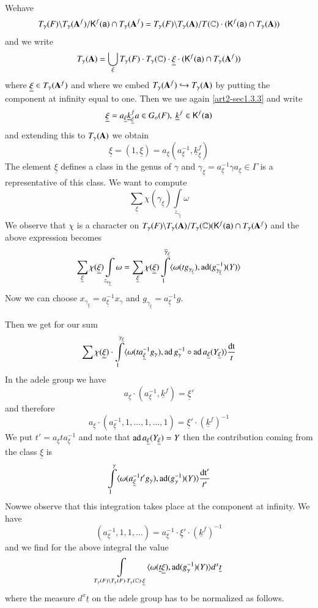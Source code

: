 We\pageoriginale have
$$
T_{\gamma}(F)\backslash T_{\gamma}(\mathbf{A}^{f})/\mathsf{K}^{f}(\mathsf{a})\cap T_{\gamma}(\mathbf{A}^{f})=T_{\gamma}(F)\backslash T_{\gamma}(\mathbf{A})/T(\mathbb{C})\cdot (\mathsf{K}^{f}(\mathsf{a})\cap T_{\gamma}(\mathbf{A}))
$$
and we write
$$
T_{\gamma}(\mathbf{A})=\bigcup\limits_{\xi}T_{\gamma}(F)\cdot T_{\gamma}(\mathbb{C})\cdot \underline{\xi}\cdot (\mathsf{K}^{f}(\mathsf{a})\cap T_{\gamma}(\mathbf{A}^{f}))
$$
where $\underline{\xi}\in T_{\gamma}(\mathbf{A}^{f})$ and where we embed $T_{\gamma}(\mathbf{A}^{f})\hookrightarrow T_{\gamma}(\mathbf{A})$ by putting the component at infinity equal to one. Then we use again \ref{art2-sec1.3.3} and write
$$
\underline{\xi}=a_{\underline{\xi}}\underline{k}^{f}_{\underline{\xi}} a\in G_{o}(F), \ \underline{k}^{f}\in \mathsf{K}^{f}(\mathsf{a})
$$
and extending this to $T_{\gamma}(\mathbf{A})$ we obtain
$$
\underline{\xi}=(1,\underline{\xi})=a_{\underline{\xi}}(a^{-1}_{\underline{\xi}},\underline{k}^{f}_{\underline{\xi}})
$$
The element $\underline{\xi}$ defines a class in the genus of $\gamma$ and $\gamma_{\underline{\xi}}=a^{-1}_{\underline{\xi}}\gamma a_{\underline{\xi}}\in \Gamma$ is a representative of this class. We want to compute
$$
\sum\limits_{\underline{\xi}}\chi(\gamma_{\underline{\xi}})\int\limits_{z_{\gamma_{\underline{\xi}}}}\omega
$$
We observe that $\chi$ is a character on $T_{\gamma}(F)\backslash T_{\gamma}(\mathbf{A})/T_{\gamma}(\mathbb{C})(\mathsf{K}^{f}(\mathsf{a})\cap T_{\gamma}(\mathbf{A}^{f})$ and the above expression becomes
$$
\sum\limits_{\underline{\xi}}\chi(\underline{\xi})\int\limits_{z_{\gamma_{\underline{\gamma}}}}\omega=\sum\limits_{\underline{\xi}}\chi(\underline{\xi})\int\limits^{\overline{\gamma}_{\underline{\xi}}}_{1}\langle \omega(tg_{\gamma_{\underline{\xi}}}), \operatorname{ad}(g^{-1}_{\gamma_{\underline{\xi}}})(Y)\rangle
$$
Now we can choose $x_{\gamma_{\underline{\xi}}}=a^{-1}_{\underline{\xi}}x_{\gamma}$ and $g_{\gamma_{\underline{\xi}}}=a^{-1}_{\underline{\xi}}g$.

Then we get for our sum
$$
\sum \chi(\underline{\xi})\cdot \int\limits^{\gamma_{\underline{\xi}}}_{1}\langle \omega(ta^{-1}_{\underline{\xi}}g_{\gamma}), \operatorname{ad} g^{-1}_{\gamma}\circ \operatorname{ad} a_{\underline{\xi}}(Y_{\underline{\xi}})\rangle \dfrac{\operatorname{dt}}{t}
$$
In the adele group we have
$$
a_{\underline{\xi}}\cdot (a^{-1}_{\underline{\xi}},\underline{k}^{f})=\underline{\xi}'
$$
and therefore
$$
a_{\underline{\xi}}\cdot (a^{-1}_{\underline{\xi}},1,\ldots,1,\ldots,1)=\underline{\xi}'\cdot (\underline{k}^{f})^{-1}
$$
We put $t'=a_{\underline{\xi}}ta^{-1}_{\underline{\xi}}$ and note that $\operatorname{ad} a_{\underline{\xi}}(Y_{\underline{\xi}})=Y$ then the contribution coming from the class $\underline{\xi}$ is
$$
\int\limits^{\gamma}_{1}\langle \omega(a^{-1}_{\underline{\xi}}t'g_{\gamma}),\operatorname{ad}(g^{-1}_{\gamma})(Y)\rangle \dfrac{\operatorname{dt}'}{t'}
$$
Now\pageoriginale we observe that this integration takes place at the component at infinity. We have
$$
(a^{-1}_{\underline{\xi}},1,1,\ldots)=a^{-1}_{\underline{\xi}}\cdot \underline{\xi}'\cdot (\underline{k}^{f})^{-1}
$$
and we find for the above integral the value
$$
\int\limits_{T_{\gamma}(F)\backslash T_{\gamma}(F)\cdot T_{\gamma}(\mathbb{C})\cdot \underline{\xi}}\langle \omega(\underline{t}\underline{\xi}),\operatorname{ad} (g^{-1}_{\gamma})(Y)\rangle d^{x}\underline{t}
$$
where the measure $d^{x}\underline{t}$ on the adele group has to be normalized as follows.

